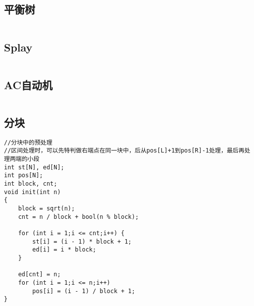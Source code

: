 \documentclass[twocolumn,a4]{article}
\begin{document}
\subsection{平衡树}
\begin{lstlisting}

\end{lstlisting}

\subsection{Splay}
\begin{lstlisting}

\end{lstlisting}

\subsection{AC自动机}
\begin{lstlisting}

\end{lstlisting}

\subsection{分块}
\begin{lstlisting}
//分块中的预处理
//区间处理时，可以先特判做右端点在同一块中，后从pos[L]+1到pos[R]-1处理，最后再处理两端的小段
int st[N], ed[N];
int pos[N];
int block, cnt;
void init(int n)
{
    block = sqrt(n);
    cnt = n / block + bool(n % block);

    for (int i = 1;i <= cnt;i++) {
        st[i] = (i - 1) * block + 1;
        ed[i] = i * block;
    }

    ed[cnt] = n;
    for (int i = 1;i <= n;i++)
        pos[i] = (i - 1) / block + 1;
}
\end{lstlisting}
\end{document}
